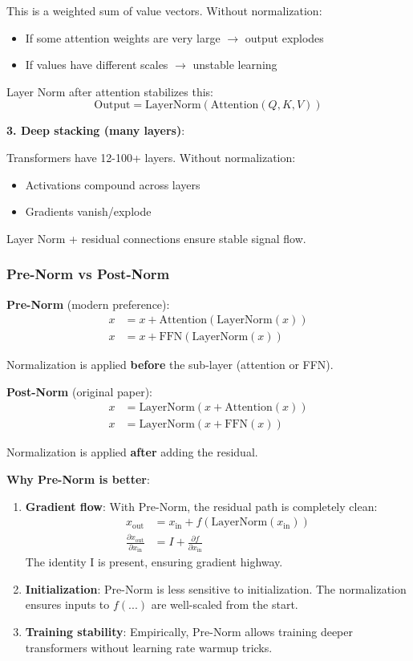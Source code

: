 \documentclass[11pt,oneside]{book}
\begin{document}
This is a weighted sum of value vectors. Without normalization:
\begin{itemize}
\item If some attention weights are very large $\to$ output explodes
\item If values have different scales $\to$ unstable learning
\end{itemize}

Layer Norm after attention stabilizes this:
\[
\text{Output} = \text{LayerNorm}(\text{Attention}(Q, K, V))
\]

\textbf{3. Deep stacking (many layers)}:

Transformers have 12-100+ layers. Without normalization:
\begin{itemize}
\item Activations compound across layers
\item Gradients vanish/explode
\end{itemize}

Layer Norm + residual connections ensure stable signal flow.

\subsubsection{Pre-Norm vs Post-Norm}

\textbf{Pre-Norm} (modern preference):
\begin{align*}
x &= x + \text{Attention}(\text{LayerNorm}(x)) \\
x &= x + \text{FFN}(\text{LayerNorm}(x))
\end{align*}

Normalization is applied \textbf{before} the sub-layer (attention or FFN).

\textbf{Post-Norm} (original paper):
\begin{align*}
x &= \text{LayerNorm}(x + \text{Attention}(x)) \\
x &= \text{LayerNorm}(x + \text{FFN}(x))
\end{align*}

Normalization is applied \textbf{after} adding the residual.

\textbf{Why Pre-Norm is better}:

\begin{enumerate}
\item \textbf{Gradient flow}: With Pre-Norm, the residual path is completely clean:
\begin{align*}
x_{\text{out}} &= x_{\text{in}} + f(\text{LayerNorm}(x_{\text{in}})) \\
\frac{\partial x_{\text{out}}}{\partial x_{\text{in}}} &= I + \frac{\partial f}{\partial x_{\text{in}}}
\end{align*}
The identity I is present, ensuring gradient highway.

\item \textbf{Initialization}: Pre-Norm is less sensitive to initialization. The normalization ensures inputs to $f(...)$ are well-scaled from the start.

\item \textbf{Training stability}: Empirically, Pre-Norm allows training deeper transformers without learning rate warmup tricks.
\end{enumerate}
\end{document}
